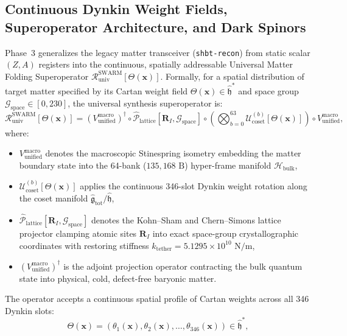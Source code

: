 \documentclass[11pt,onecolumn]{article}
\begin{document}
\FloatBarrier
\subsection{Continuous Dynkin Weight Fields, Superoperator Architecture, and Dark Spinors}
Phase~3 generalizes the legacy matter transceiver (\texttt{shbt-recon}) from static scalar $(Z, A)$ registers into the continuous, spatially addressable Universal Matter Folding Superoperator $\mathcal{R}_{\text{univ}}^{\text{SWARM}}[\Theta(\mathbf{x})]$. Formally, for a spatial distribution of target matter specified by its Cartan weight field $\Theta(\mathbf{x}) \in \hat{\mathfrak{h}}^*$ and space group $\mathcal{G}_{\text{space}} \in [0, 230]$, the universal synthesis superoperator is:
\begin{equation}
\mathcal{R}_{\text{univ}}^{\text{SWARM}}[\Theta(\mathbf{x})] = (V_{\text{unified}}^{\text{macro}})^\dagger \circ \hat{\mathcal{P}}_{\text{lattice}}[\mathbf{R}_I, \mathcal{G}_{\text{space}}] \circ \left( \bigotimes_{b=0}^{63} \mathcal{U}_{\text{coset}}^{(b)}[\Theta(\mathbf{x})] \right) \circ V_{\text{unified}}^{\text{macro}},
\label{eq:universal_cloner_operator}
\end{equation}
where:
\begin{itemize}
    \item $V_{\text{unified}}^{\text{macro}}$ denotes the macroscopic Stinespring isometry embedding the matter boundary state into the 64-bank ($135{,}168\text{ B}$) hyper-frame manifold $\mathcal{H}_{\text{bulk}}$,
    \item $\mathcal{U}_{\text{coset}}^{(b)}[\Theta(\mathbf{x})]$ applies the continuous 346-slot Dynkin weight rotation along the coset manifold $\hat{\mathfrak{g}}_{\text{tot}} / \hat{\mathfrak{h}}$,
    \item $\hat{\mathcal{P}}_{\text{lattice}}[\mathbf{R}_I, \mathcal{G}_{\text{space}}]$ denotes the Kohn--Sham and Chern--Simons lattice projector clamping atomic sites $\mathbf{R}_I$ into exact space-group crystallographic coordinates with restoring stiffness $k_{\text{tether}} = 5.1295 \times 10^{10}\text{ N/m}$,
    \item $(V_{\text{unified}}^{\text{macro}})^\dagger$ is the adjoint projection operator contracting the bulk quantum state into physical, cold, defect-free baryonic matter.
\end{itemize}
The operator accepts a continuous spatial profile of Cartan weights across all 346 Dynkin slots:
\begin{equation}
\Theta(\mathbf{x}) = \left( \theta_1(\mathbf{x}), \theta_2(\mathbf{x}), \dots, \theta_{346}(\mathbf{x}) \right) \in \hat{\mathfrak{h}}^*,
\label{eq:dynkin_spatial_field}
\end{equation}
\end{document}
